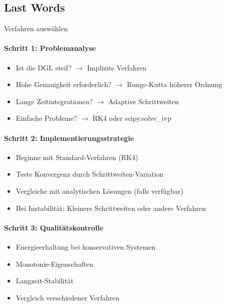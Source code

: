 \subsection{Last Words}

\begin{KR}{Verfahren auswählen}
\paragraph{Schritt 1: Problemanalyse}
\begin{itemize}
    \item Ist die DGL steif? $\rightarrow$ Implizite Verfahren
    \item Hohe Genauigkeit erforderlich? $\rightarrow$ Runge-Kutta höherer Ordnung
    \item Lange Zeitintegrationen? $\rightarrow$ Adaptive Schrittweiten
    \item Einfache Probleme? $\rightarrow$ RK4 oder scipy.solve\_ivp
\end{itemize}

\paragraph{Schritt 2: Implementierungsstrategie}
\begin{itemize}
    \item Beginne mit Standard-Verfahren (RK4)
    \item Teste Konvergenz durch Schrittweiten-Variation
    \item Vergleiche mit analytischen Lösungen (falls verfügbar)
    \item Bei Instabilität: Kleinere Schrittweiten oder andere Verfahren
\end{itemize}

\paragraph{Schritt 3: Qualitätskontrolle}
\begin{itemize}
    \item Energieerhaltung bei konservativen Systemen
    \item Monotonie-Eigenschaften
    \item Langzeit-Stabilität
    \item Vergleich verschiedener Verfahren
\end{itemize}
\end{KR}

\raggedcolumns


